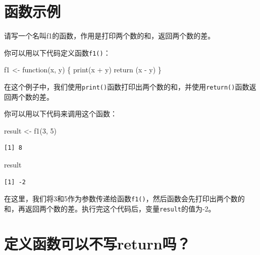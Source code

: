\documentclass[
  letterpaper,
  DIV=11,
  numbers=noendperiod]{scrreprt}
\newenvironment{Shaded}{\begin{snugshade}}{\end{snugshade}}
\newcommand{\ControlFlowTok}[1]{\textcolor[rgb]{0.00,0.23,0.31}{#1}}
\newcommand{\DecValTok}[1]{\textcolor[rgb]{0.68,0.00,0.00}{#1}}
\newcommand{\FunctionTok}[1]{\textcolor[rgb]{0.28,0.35,0.67}{#1}}
\newcommand{\NormalTok}[1]{\textcolor[rgb]{0.00,0.23,0.31}{#1}}
\newcommand{\OtherTok}[1]{\textcolor[rgb]{0.00,0.23,0.31}{#1}}
\newcommand{\SpecialCharTok}[1]{\textcolor[rgb]{0.37,0.37,0.37}{#1}}
\begin{document}
\hypertarget{ux51fdux6570ux793aux4f8b}{%
\section{函数示例}\label{ux51fdux6570ux793aux4f8b}}

请写一个名叫f1的函数，作用是打印两个数的和，返回两个数的差。

你可以用以下代码定义函数\texttt{f1()}：

\begin{Shaded}
\begin{Highlighting}[]
\NormalTok{f1 }\OtherTok{\textless{}{-}} \ControlFlowTok{function}\NormalTok{(x, y) \{}
  \FunctionTok{print}\NormalTok{(x }\SpecialCharTok{+}\NormalTok{ y)}
  \FunctionTok{return}\NormalTok{ (x }\SpecialCharTok{{-}}\NormalTok{ y)}
\NormalTok{\}}
\end{Highlighting}
\end{Shaded}

在这个例子中，我们使用\texttt{print()}函数打印出两个数的和，并使用\texttt{return()}函数返回两个数的差。

你可以用以下代码来调用这个函数：

\begin{Shaded}
\begin{Highlighting}[]
\NormalTok{result }\OtherTok{\textless{}{-}} \FunctionTok{f1}\NormalTok{(}\DecValTok{3}\NormalTok{, }\DecValTok{5}\NormalTok{)}
\end{Highlighting}
\end{Shaded}

\begin{verbatim}
[1] 8
\end{verbatim}

\begin{Shaded}
\begin{Highlighting}[]
\NormalTok{result}
\end{Highlighting}
\end{Shaded}

\begin{verbatim}
[1] -2
\end{verbatim}

在这里，我们将3和5作为参数传递给函数\texttt{f1()}，然后函数会先打印出两个数的和，再返回两个数的差。执行完这个代码后，变量\texttt{result}的值为-2。

\hypertarget{ux5b9aux4e49ux51fdux6570ux53efux4ee5ux4e0dux5199returnux5417}{%
\section{定义函数可以不写return吗？}\label{ux5b9aux4e49ux51fdux6570ux53efux4ee5ux4e0dux5199returnux5417}}
\end{document}
